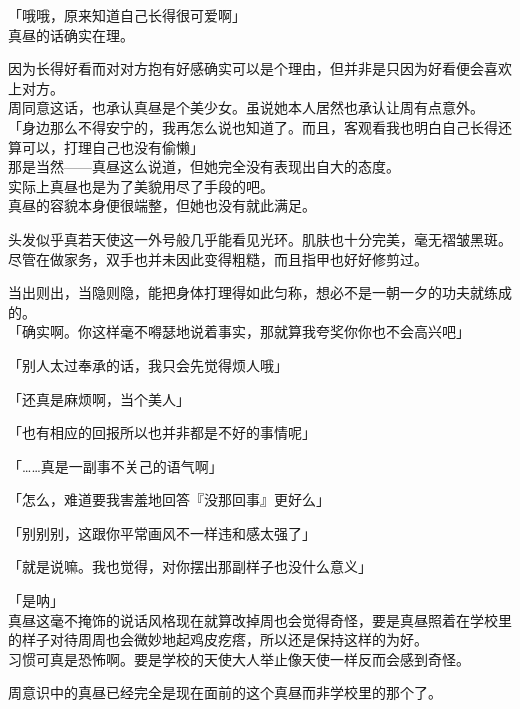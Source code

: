 「哦哦，原来知道自己长得很可爱啊」\\

真昼的话确实在理。

因为长得好看而对对方抱有好感确实可以是个理由，但并非是只因为好看便会喜欢上对方。\\

周同意这话，也承认真昼是个美少女。虽说她本人居然也承认让周有点意外。\\

「身边那么不得安宁的，我再怎么说也知道了。而且，客观看我也明白自己长得还算可以，打理自己也没有偷懒」\\

那是当然——真昼这么说道，但她完全没有表现出自大的态度。\\

实际上真昼也是为了美貌用尽了手段的吧。\\

真昼的容貌本身便很端整，但她也没有就此满足。

头发似乎真若天使这一外号般几乎能看见光环。肌肤也十分完美，毫无褶皱黑斑。尽管在做家务，双手也并未因此变得粗糙，而且指甲也好好修剪过。

当出则出，当隐则隐，能把身体打理得如此匀称，想必不是一朝一夕的功夫就练成的。\\

「确实啊。你这样毫不嘚瑟地说着事实，那就算我夸奖你你也不会高兴吧」

「别人太过奉承的话，我只会先觉得烦人哦」

「还真是麻烦啊，当个美人」

「也有相应的回报所以也并非都是不好的事情呢」

「……真是一副事不关己的语气啊」

「怎么，难道要我害羞地回答『没那回事』更好么」

「别别别，这跟你平常画风不一样违和感太强了」

「就是说嘛。我也觉得，对你摆出那副样子也没什么意义」

「是呐」\\

真昼这毫不掩饰的说话风格现在就算改掉周也会觉得奇怪，要是真昼照着在学校里的样子对待周周也会微妙地起鸡皮疙瘩，所以还是保持这样的为好。\\

习惯可真是恐怖啊。要是学校的天使大人举止像天使一样反而会感到奇怪。

周意识中的真昼已经完全是现在面前的这个真昼而非学校里的那个了。\\


